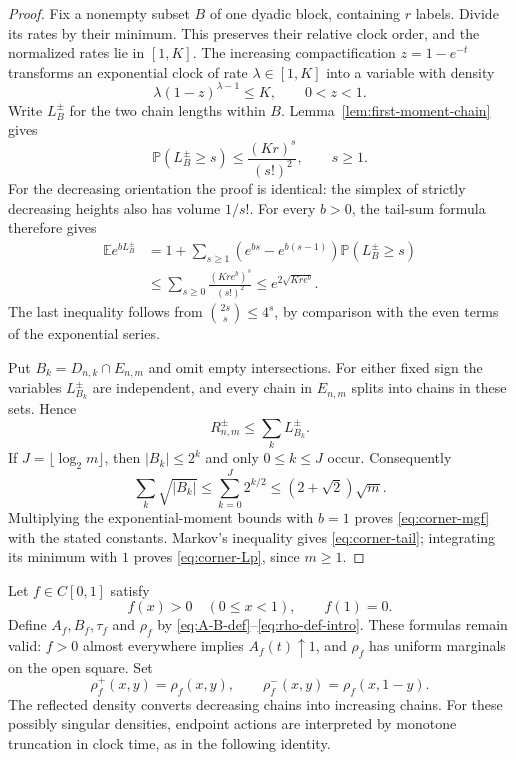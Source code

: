 \documentclass[11pt]{article}
\theoremstyle{remark}
\newcommand{\Pp}{\mathbb P}
\newcommand{\Ee}{\mathbb E}
\begin{document}
\begin{proof}
Fix a nonempty subset $B$ of one dyadic block, containing $r$ labels.
Divide its rates by their minimum.  This preserves their relative clock
order, and the normalized rates lie in $[1,K]$.  The increasing
compactification $z=1-e^{-t}$ transforms an exponential clock of rate
$\lambda\in[1,K]$ into a variable with density
\[
        \lambda(1-z)^{\lambda-1}\le K,
        \qquad 0<z<1.
\]
Write $L_B^{\pm}$ for the two chain lengths within $B$.
Lemma~\ref{lem:first-moment-chain} gives
\begin{equation}\label{eq:block-first-moment}
        \Pp(L_B^{\pm}\ge s)\le\frac{(Kr)^s}{(s!)^2},
        \qquad s\ge1.
\end{equation}
For the decreasing orientation the proof is identical: the simplex of
strictly decreasing heights also has volume $1/s!$.
For every $b>0$, the tail-sum formula therefore gives
\begin{align*}
 \Ee e^{bL_B^{\pm}}
 &=1+\sum_{s\ge1}
       (e^{bs}-e^{b(s-1)})\Pp(L_B^{\pm}\ge s)\\
 &\le\sum_{s\ge0}\frac{(Kre^b)^s}{(s!)^2}
 \le e^{2\sqrt{Kre^b}}.
\end{align*}
The last inequality follows from
$\binom{2s}{s}\le4^s$, by comparison with the even terms of the exponential
series.

Put $B_k=D_{n,k}\cap E_{n,m}$ and omit empty intersections.  For either
fixed sign the variables $L_{B_k}^{\pm}$ are independent, and every chain
in $E_{n,m}$ splits into chains in these sets.  Hence
\[
        R_{n,m}^{\pm}\le\sum_k L_{B_k}^{\pm}.
\]
If $J=\lfloor\log_2m\rfloor$, then $|B_k|\le2^k$ and only
$0\le k\le J$ occur.  Consequently
\[
 \sum_k\sqrt{|B_k|}
 \le\sum_{k=0}^J2^{k/2}
 \le(2+\sqrt2)\sqrt m.
\]
Multiplying the exponential-moment bounds with $b=1$ proves
\eqref{eq:corner-mgf} with the stated constants.  Markov's inequality gives
\eqref{eq:corner-tail}; integrating its minimum with $1$ proves
\eqref{eq:corner-Lp}, since $m\ge1$.
\end{proof}

Let $f\in C[0,1]$ satisfy
\begin{equation}\label{eq:endpoint-profile}
        f(x)>0\quad(0\le x<1),
        \qquad f(1)=0.
\end{equation}
Define $A_f,B_f,\tau_f$ and $\rho_f$ by
\eqref{eq:A-B-def}--\eqref{eq:rho-def-intro}.  These formulas remain valid:
$f>0$ almost everywhere implies $A_f(t)\uparrow1$, and $\rho_f$ has uniform
marginals on the open square.  Set
\[
        \rho_f^+(x,y)=\rho_f(x,y),
        \qquad
        \rho_f^-(x,y)=\rho_f(x,1-y).
\]
The reflected density converts decreasing chains into increasing chains.
For these possibly singular densities, endpoint actions are interpreted by
monotone truncation in clock time, as in the following identity.
\end{document}
